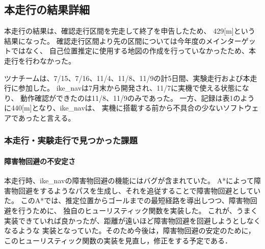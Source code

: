 \documentclass[twocolumn,9pt]{jsproceedings}
\begin{document}


\subsection{本走行の結果詳細}
本走行の結果は、確認走行区間を完走して終了を申告したため、
429[m]という結果になった。
確認走行区間より先の区間については今年度のメインターゲットではなく、
自己位置推定に使用する地図の作成を行っていなかったため、本走行を行わなかった。

ツナチームは、7/15、7/16、11/4、11/8、11/9の計5日間、実験走行および本走行に参加した。
ike\_navは7月末から開発され、11/7に実機で使える状態になり、
動作確認ができたのは11/8、11/9のみであった。
一方、記録は表1のように440[m]となり、ike\_navは、
実機に搭載する前から不具合の少ないソフトウェアであったと言える。

\subsubsection{本走行・実験走行で見つかった課題}
\paragraph{障害物回避の不安定さ}
本走行時、ike\_navの障害物回避の機能にはバグが含まれていた。
A*によって障害物回避をするようなパスを生成し、それを追従することで障害物回避としていた。
このA*では、推定位置からゴールまでの最短経路を導出しつつ、障害物回避を行うために、
独自のヒューリスティック関数を実装した。
これが、うまく実装できていれば良かったが、距離が遠いほど障害物回避を回避しようとしなくなるような
実装となっていた。そのため今後は，障害物回避の安定のために，このヒューリスティック関数の実装を見直し，修正をする予定である．

\end{document}
